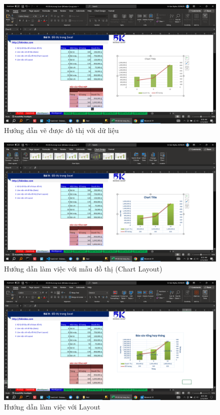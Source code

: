 \documentclass{article}
\begin{document}
\begin{figure}[H]
    \centering
    \includegraphics[scale = 0.15]{Bai2/HuongDan/1.png}
    \caption{Hướng dẫn vẽ được đồ thị với dữ liệu}
\end{figure}

\begin{figure}[H]
    \centering
    \includegraphics[scale = 0.15]{Bai2/HuongDan/2.png}
    \caption{Hướng dẫn làm việc với mẫu đồ thị (Chart Layout)}
\end{figure}

\begin{figure}[H]
    \centering
    \includegraphics[scale = 0.15]{Bai2/HuongDan/3.png}
    \caption{Hướng dẫn làm việc với Layout}
\end{figure}
\end{document}
